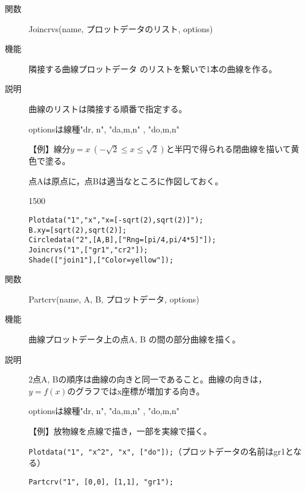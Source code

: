 \documentclass[papersize,a4paper,10pt,uplatex]{jsarticle}
\begin{document}
\begin{description}
\vspace{\baselineskip}
\hypertarget{joincrvs}{}
\item[関数]Joincrvs(name, プロットデータのリスト, options) 
\item[機能]隣接する曲線プロットデータ のリストを繋いで1本の曲線を作る。
\item[説明]曲線のリストは隣接する順番で指定する。

optionsは線種"dr, n", "da,m,n" , "do,m,n"

\vspace{\baselineskip}
【例】線分$y=x\ (-\sqrt{2} \leq x \leq \sqrt{2})$と半円で得られる閉曲線を描いて黄色で塗る。

点Aは原点に，点Bは適当なところに作図しておく。

\begin{layer}{150}{0}
\end{layer}

\begin{verbatim}
Plotdata("1","x","x=[-sqrt(2),sqrt(2)]");
B.xy=[sqrt(2),sqrt(2)];
Circledata("2",[A,B],["Rng=[pi/4,pi/4*5]"]);
Joincrvs("1",["gr1","cr2"]);
Shade(["join1"],["Color=yellow"]);
\end{verbatim}
\vspace{5mm}

\vspace{\baselineskip}
\hypertarget{partcrv}{}
\item[関数]Partcrv(name, A, B, プロットデータ, options) 
\item[機能]曲線プロットデータ上の点A, B の間の部分曲線を描く。
\item[説明]2点A, Bの順序は曲線の向きと同一であること。曲線の向きは，$y=f(x)$のグラフではx座標が増加する向き。

optionsは線種"dr, n", "da,m,n" , "do,m,n"

\vspace{\baselineskip}
【例】放物線を点線で描き，一部を実線で描く。

\verb|Plotdata("1", "x^2", "x", ["do"]);|（プロットデータの名前はgr1となる）

\verb|Partcrv("1", [0,0], [1,1], "gr1");|

\begin{center}  \end{center}


\end{description}
\end{document}
